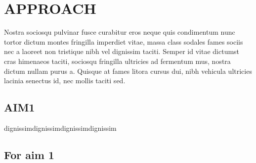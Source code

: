 \documentclass[11pt,twoside]{report}
\newcommand{\mytextbox}[2][6]{%
\begin{framed}
\noindent#2%
\end{framed}}
\begin{document}
\section{APPROACH}
Nostra sociosqu pulvinar fusce curabitur eros neque quis condimentum nunc tortor dictum montes fringilla imperdiet vitae, massa class sodales fames sociis nec a laoreet non tristique nibh vel dignissim taciti. Semper id vitae dictumst cras himenaeos taciti, sociosqu fringilla ultricies ad fermentum mus, nostra dictum nullam purus a. Quisque at fames litora cursus dui, nibh vehicula ultricies lacinia senectus id, nec mollis taciti sed.

\mytextbox[1]{\subsection*{AIM1} dignissimdignissimdignissimdignissim}
\subsection{For aim 1}





\end{document}

